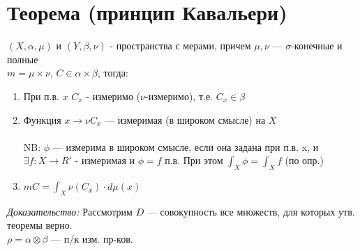 \documentclass[paper=a4, fontsize=17pt]{article}
\begin{document}
\section{Теорема (принцип Кавальери)}
	$(X, \alpha, \mu)$ и $(Y, \beta, \nu)$ - пространства с мерами, причем $\mu , \nu$ --- $\sigma$-конечные и полные\\
	$m = \mu \times \nu$, $C \in \alpha\times\beta$, тогда:\\
	\begin{enumerate}
		\item
		При п.в. $x$ $C_x$ - измеримо ($\nu$-измеримо), т.е. $C_x \in \beta$
		\item
		Функция $x \rightarrow \nu C_x$ --- измеримая (в широком смысле) на $X$\\ \\
		NB: $\phi$ --- измерима в широком смысле, если она задана при п.в. x, и $\exists f : X \rightarrow R'$ - измеримая и $\phi = f$ п.в. При этом $\int_X \phi = \int_X f$ (по опр.)
		\item
		$m C = \int_X \nu(C_x) \cdot d\mu(x)$
	\end{enumerate}
	\emph{Доказательство: }
		Рассмотрим $D$ --- совокупность все множеств, для которых утв. теоремы верно.\\
		$\rho = \alpha\otimes\beta$ --- п/к изм. пр-ков.\\
\end{document}
